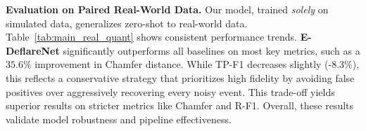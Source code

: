 \noindent\textbf{Evaluation on Paired Real-World Data.}
Our model, trained \emph{solely} on simulated data, generalizes zero-shot to real-world data. Table~\ref{tab:main_real_quant} shows consistent performance trends. \textbf{E-DeflareNet} significantly outperforms all baselines on most key metrics, such as a $\mathbf{35.6\%}$ improvement in Chamfer distance. While TP-F1 decreases slightly (-$8.3\%$), this reflects a conservative strategy that prioritizes high fidelity by avoiding false positives over aggressively recovering every noisy event. This trade-off yields superior results on stricter metrics like Chamfer and R-F1. Overall, these results validate model robustness and pipeline effectiveness.




